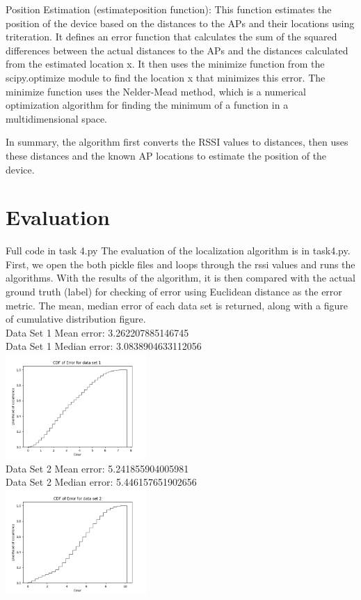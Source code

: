 Position Estimation (estimateposition function): This function estimates the position of the device based on the distances to the APs and their locations using triteration. It defines an error function that calculates the sum of the squared differences between the actual distances to the APs and the distances calculated from the estimated location x. It then uses the minimize function from the scipy.optimize module to find the location x that minimizes this error. The minimize function uses the Nelder-Mead method, which is a numerical optimization algorithm for finding the minimum of a function in a multidimensional space.

In summary, the algorithm first converts the RSSI values to distances, then uses these distances and the known AP locations to estimate the position of the device.



\section{Evaluation}
Full code in task 4.py
The evaluation of the localization algorithm is in task4.py. First, we open the both pickle files and loops through the rssi values and runs the algorithms. With the results of the algorithm, it is then compared with the actual ground truth (label) for checking of error using Euclidean distance as the error metric. The mean, median error of each data set is returned, along with a figure of cumulative distribution figure. \\

Data Set 1 Mean error: 3.262207885146745\\
Data Set 1 Median error: 3.0838904633112056\\
\includegraphics[width=0.4\textwidth]{error_cdf1.png}\\

Data Set 2 Mean error: 5.241855904005981 \\
Data Set 2 Median error: 5.446157651902656\\ 
\includegraphics[width=0.4\textwidth]{error_cdf2.png}\\

